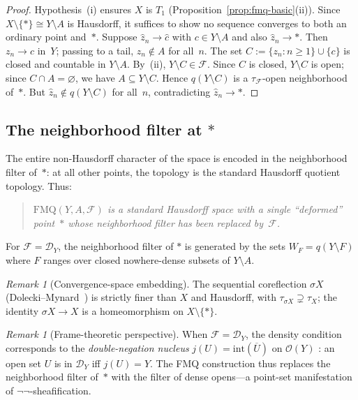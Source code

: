 \documentclass[11pt]{article}
\theoremstyle{definition}
\theoremstyle{remark}
\newtheorem{remark}[theorem]{Remark}
\begin{document}
\begin{proof}
Hypothesis~(i) ensures $X$ is $T_1$ (Proposition~\ref{prop:fmq-basic}(ii)).
Since $X \setminus \{\ast\} \cong Y \setminus A$ is Hausdorff, it suffices to
show no sequence converges to both an ordinary point and~$\ast$.
Suppose $\hat{z}_n \to \hat{c}$ with $c \in Y \setminus A$ and also $\hat{z}_n \to \ast$.
Then $z_n \to c$ in~$Y$; passing to a tail, $z_n \notin A$ for all~$n$. The set
$C := \{z_n : n \geq 1\} \cup \{c\}$ is closed and countable in $Y \setminus A$. By~(ii),
$Y \setminus C \in \mathcal{F}$. Since $C$ is closed, $Y \setminus C$ is open; since
$C \cap A = \varnothing$, we have $A \subseteq Y \setminus C$. Hence $q(Y \setminus C)$ is
a $\tau_{\mathcal{F}}$-open neighborhood of~$\ast$. But $\hat{z}_n \notin q(Y \setminus C)$
for all~$n$, contradicting $\hat{z}_n \to \ast$.
\end{proof}

\subsection{The neighborhood filter at $\ast$}

The entire non-Hausdorff character of the space is encoded in the
neighborhood filter of~$\ast$: at all other points, the topology is the
standard Hausdorff quotient topology. Thus:

\begin{quote}
\emph{$\mathrm{FMQ}(Y, A, \mathcal{F})$ is a standard Hausdorff space with a single
``deformed'' point~$\ast$ whose neighborhood filter has been replaced by~$\mathcal{F}$.}
\end{quote}

For $\mathcal{F} = \mathcal{D}_Y$, the neighborhood filter of $\ast$ is generated by the sets
$W_F = q(Y \setminus F)$ where $F$ ranges over closed nowhere-dense subsets of
$Y \setminus A$.

\begin{remark}[Convergence-space embedding]\label{prop:convergencespace}
The sequential coreflection $\sigma X$ (Dolecki--Mynard~\cite{bib:doleckimynard})
is strictly finer than $X$ and Hausdorff, with
$\tau_{\sigma X} \supsetneq \tau_X$; the identity
$\sigma X \to X$ is a homeomorphism on $X \setminus \{\ast\}$.
\end{remark}

\begin{remark}[Frame-theoretic perspective]\label{sec:frame}\label{rem:frame}
When $\mathcal{F} = \mathcal{D}_Y$, the density condition
corresponds to the \emph{double-negation nucleus}
$j(U) = \mathrm{int}(\overline{U})$ on $\mathcal{O}(Y)$
\cite{bib:johnstone}: an open set $U$ is in $\mathcal{D}_Y$ iff
$j(U) = Y$.
The FMQ construction thus replaces the neighborhood filter
of~$\ast$ with the filter of dense opens---a point-set manifestation
of $\neg\neg$-sheafification.
\end{remark}
\end{document}
